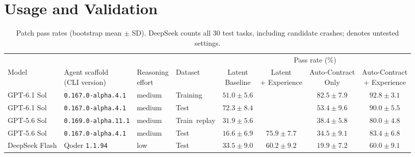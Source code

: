 \section{Usage and Validation}
\label{sec:usage}

\begin{table}[!t]
    \centering
    \caption{Patch pass rates (bootstrap mean $\pm$ SD). DeepSeek counts all 30 test tasks, including candidate crashes; \textemdash{} denotes untested settings.}
    \label{tab:tempoevo-main-evaluation}
    \small
    \setlength{\tabcolsep}{3pt}
    \begin{tabular*}{\textwidth}{@{\extracolsep{\fill}}llllcccc@{}}
        \toprule
        \multicolumn{4}{c}{} & \multicolumn{4}{c}{Pass rate (\%)} \\
        \cmidrule(lr){5-8}
        Model & \shortstack{Agent scaffold\\(CLI version)} & \shortstack{Reasoning\\effort}
        & Dataset & \shortstack{Latent\\Baseline}
        & \shortstack{Latent\\+ Experience}
        & \shortstack{Auto-Contract\\Only} & \shortstack{Auto-Contract\\+ Experience} \\
        \midrule
        GPT-6.1 Sol & \texttt{0.167.0-alpha.4.1} & medium & Training
        & $51.0 \pm 5.6$ & \textemdash{} & $82.5 \pm 7.9$ & {\boldmath$92.8 \pm 3.1$} \\
        GPT-6.1 Sol & \texttt{0.167.0-alpha.4.1} & medium & Test
        & $72.3 \pm 8.4$ & \textemdash{} & $53.4 \pm 9.6$ & {\boldmath$90.0 \pm 5.5$} \\
        \addlinespace
        GPT-5.6 Sol & \texttt{0.169.0-alpha.11.1} & medium & \mbox{Train replay}
        & $31.9 \pm 5.6$ & \textemdash{} & $38.4 \pm 5.8$ & {\boldmath$80.0 \pm 4.8$} \\
        GPT-5.6 Sol & \texttt{0.167.0-alpha.4.1} & medium & Test
        & $16.6 \pm 6.9$ & $75.9 \pm 7.7$ & $34.5 \pm 9.1$ & {\boldmath$83.4 \pm 6.8$} \\
        \addlinespace
        DeepSeek Flash & Qoder \texttt{1.1.94} & low & Test
        & $33.5 \pm 9.0$ & {\boldmath$60.2 \pm 9.2$} & $19.9 \pm 7.2$ & {\boldmath$60.0 \pm 9.1$} \\
        \bottomrule
    \end{tabular*}
\end{table}

